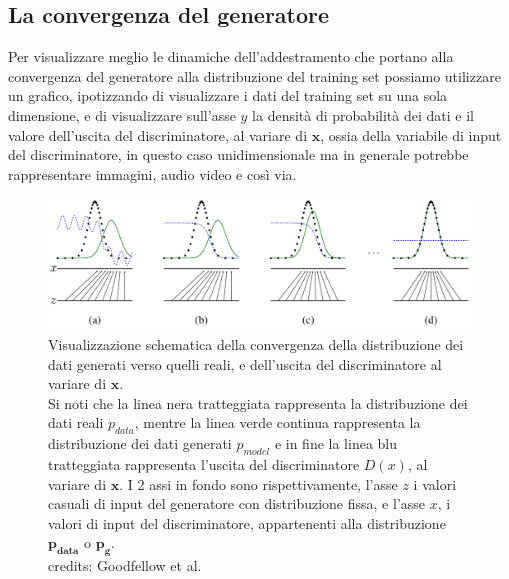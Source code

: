 \subsection{La convergenza del generatore}
Per visualizzare meglio le dinamiche dell'addestramento che portano alla convergenza del generatore alla distribuzione del training set 
possiamo utilizzare un grafico, ipotizzando di visualizzare i dati del training set su una sola dimensione,
e di visualizzare sull'asse $y$ la densità di probabilità dei dati e il valore dell'uscita del discriminatore, al variare di $\mathbf{x}$, ossia
della variabile di input del discriminatore, in questo caso unidimensionale ma in generale potrebbe rappresentare immagini, audio video e così via.

\begin{figure}[H]
    \centering
    \includegraphics[width=1.0\textwidth]{imgs/Gan training convergence.png}
    \caption{Visualizzazione schematica della convergenza della distribuzione dei dati generati verso quelli reali, e dell'uscita del discriminatore al variare di $\mathbf{x}$.\\
    Si noti che la linea nera tratteggiata rappresenta la distribuzione dei dati reali $p_{data}$, mentre la linea verde continua rappresenta la distribuzione dei dati generati $p_{model}$ e
    in fine la linea blu tratteggiata rappresenta l'uscita del discriminatore $D(x)$, al variare di $\mathbf{x}$. 
    I 2 assi in fondo sono rispettivamente, l'asse $z$ i valori casuali di input del generatore con distribuzione fissa, e l'asse $x$, 
    i valori di input del discriminatore, appartenenti alla distribuzione $\mathbf{p_{data}}$ o $\mathbf{p_{g}}$.\\
    credits: Goodfellow et al. \cite{goodfellow2014generative}}
    \label{fig:gan_training_convergence}
\end{figure}

